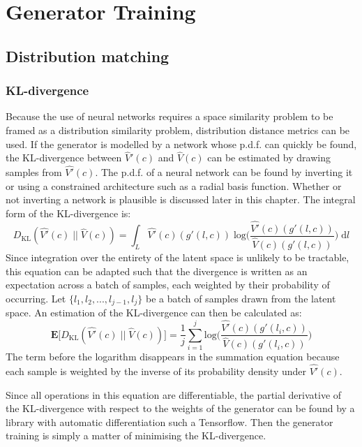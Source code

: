 \documentclass[../../main.tex]{subfiles}
\begin{document}
\chapter{Generator Training} \label{chapter:generatorTraining}

\section{Distribution matching} \label{section:distributionMatching}

\subsection{KL-divergence} \label{subsection:klDivergence}

Because the use of neural networks requires a space similarity problem to be framed as a distribution similarity problem, distribution distance metrics can be used.
If the generator is modelled by a network whose p.d.f. can quickly be found, the KL-divergence between $\hat{V}'(c)$ and $\hat{V}(c)$ can be estimated by drawing samples from $\hat{V'}(c)$.
The p.d.f. of a neural network can be found by inverting it or using a constrained architecture such as a radial basis function.
Whether or not inverting a network is plausible is discussed later in this chapter.
The integral form of the KL-divergence is:
$$D_{\text{KL}}(\hat{V'}(c)\;||\;\hat{V}(c))=\int_L\hat{V'}(c)(g'(l,c))\;\text{log}\bigg(\frac{\hat{V'}(c)(g'(l,c))}{\hat{V}(c)(g'(l,c))}\bigg)\;\mathrm{d}l$$
Since integration over the entirety of the latent space is unlikely to be tractable, this equation can be adapted such that the divergence is written as an expectation across a batch of samples, each weighted by their probability of occurring.
Let $\{l_1,l_2,...,l_{j-1},l_j\}$ be a batch of samples drawn from the latent space.
An estimation of the KL-divergence can then be calculated as:
$$\textbf{E}\big[D_{\text{KL}}(\hat{V'}(c)\;||\;\hat{V}(c))\big]=\frac{1}{j}\sum_{i=1}^{j}\text{log}\bigg(\frac{\hat{V'}(c)(g'(l_i,c))}{\hat{V}(c)(g'(l_i,c))}\bigg)$$
The term before the logarithm disappears in the summation equation because each sample is weighted by the inverse of its probability density under $\hat{V'}(c)$.

Since all operations in this equation are differentiable, the partial derivative of the KL-divergence with respect to the weights of the generator can be found by a library with automatic differentiation such a Tensorflow.
Then the generator training is simply a matter of minimising the KL-divergence.
\end{document}
